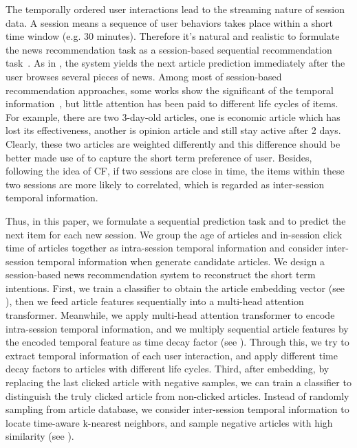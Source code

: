 The temporally ordered user interactions lead to the streaming nature of session data. A session means a sequence of user behaviors takes place within a short time window (e.g. 30 minutes). Therefore it's natural and realistic to formulate the news recommendation task as a session-based sequential recommendation task~\cite{sottocornola2018session,grabe1991current}. As in , the system yields the next article prediction immediately after the user browses several pieces of news. 
Among most of session-based recommendation approaches, some works show the significant of the temporal information~\cite{garg2019sequence,rakkappan2019context,xu2019time}, but little attention has been paid to different life cycles of items. For example, there are two 3-day-old articles, one is economic article which has lost its effectiveness, another is opinion article and still stay active after 2 days. Clearly, these two articles are weighted differently and this difference should be better made use of to capture the short term preference of user. Besides, following the idea of CF, if two sessions are close in time, the items within these two sessions are more likely to correlated, which is regarded as inter-session temporal information.

Thus, in this paper, we formulate a sequential prediction task and to predict the next item for each new session. We group the age of articles and in-session click time of articles together as intra-session temporal information and consider inter-session temporal information when generate candidate articles. We design a session-based news recommendation system to reconstruct the short term intentions. First, we train a classifier to obtain the article embedding vector (see ), then we feed article features sequentially into a multi-head attention transformer. Meanwhile, we apply multi-head attention transformer to encode intra-session temporal information, and we multiply sequential article features by the encoded temporal feature as time decay factor (see ). Through this, we try to extract temporal information of each user interaction, and apply different time decay factors to articles with different life cycles. Third, after embedding, by replacing the last clicked article with negative samples, we can train a classifier to distinguish the truly clicked article from non-clicked articles. Instead of randomly sampling from article database, we consider inter-session temporal information to locate time-aware k-nearest neighbors, and sample negative articles with high similarity (see ). 

